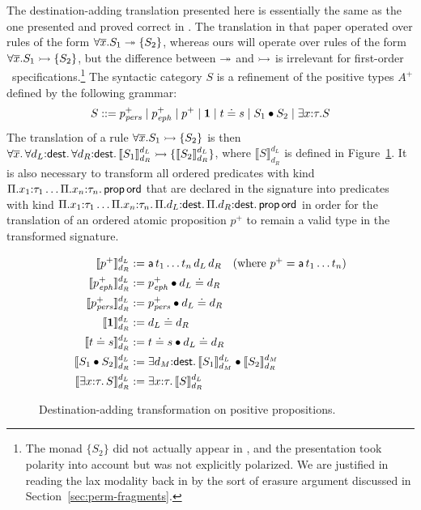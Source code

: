 The destination-adding translation presented here is essentially the
same as the one presented and proved correct in
\cite{simmons11logical}. The translation in that paper operated over
rules of the form $\forall \overline{x}. S_1 \twoheadrightarrow \{ S_2 \}$,
whereas ours will operate over rules of the form $\forall
\overline{x}. S_1 \rightarrowtail \{ S_2 \}$, but the difference between
$\twoheadrightarrow$ and $\rightarrowtail$ is irrelevant for first-order
\sls~specifications.\footnote{The monad $\{ S_2 \}$ did not actually
  appear in \cite{simmons11logical}, and the presentation took
  polarity into account but was not explicitly polarized. We are
  justified in reading the lax modality back in by the sort of erasure
  argument discussed in Section~\ref{sec:perm-fragments}.} The syntactic
category $S$ is a refinement of the positive types $A^+$ defined by
the following grammar:
\[
S ::= p^+_{\it pers} \mid p^+_{\it eph} \mid p^+ \mid \mathbf{1}
\mid t \doteq s \mid S_1 \mathbin{\bullet} S_2 \mid \exists x{:}\tau. S
\]
The translation of a rule $\forall \overline{x}. S_1 \rightarrowtail \{ S_2 \}$
is then $\forall \overline{x}.\, \forall d_L{:}{\sf dest}.\, \forall
d_R{:}{\sf dest}.\, \llbracket S_1 \rrbracket^{d_L}_{d_R} \rightarrowtail \{
\llbracket S_2 \rrbracket^{d_L}_{d_R} \}$, where $\llbracket S
\rrbracket^{d_L}_{d_R}$ is defined in Figure~\ref{fig:destadd-pos}. It
is also necessary to transform all ordered predicates with kind
$\Pi. x_1{:}\tau_1\ldots \Pi.x_n{:}\tau_n.\,{\sf prop\,ord}$ that are
declared in the signature into predicates with kind
$\Pi. x_1{:}\tau_1\ldots \Pi.x_n{:}\tau_n.\, \Pi.d_L{:}{\sf dest}.\,
\Pi.d_R{:}{\sf dest}.\, {\sf prop\,ord}$ in order for the translation
of an ordered atomic proposition $p^+$ to remain a valid type in
the transformed signature.

\begin{figure}
\begin{align*}
\llbracket p^+ \rrbracket^{d_L}_{d_R} & := 
 {\sf a}\,t_1\ldots t_n\,d_L\,d_R ~~~ \mbox{(where $p^+ = {\sf a}\,t_1\ldots t_n$)}
\\
\llbracket p^+_{\it eph} \rrbracket^{d_L}_{d_R} & := p^+_{\it eph} \mathbin{\bullet} d_L \doteq d_R
\\
\llbracket p^+_{\it pers} \rrbracket^{d_L}_{d_R} & := p^+_{\it pers} \mathbin{\bullet} d_L \doteq d_R
\\
\llbracket \mathbf{1} \rrbracket^{d_L}_{d_R} & := d_L \doteq d_R
\\
\llbracket t \doteq s \rrbracket^{d_L}_{d_R} & := t \doteq s \mathbin{\bullet} d_L \doteq d_R
\\
\llbracket S_1 \mathbin{\bullet} S_2 \rrbracket^{d_L}_{d_R} & := 
 \exists d_M{:}{\sf dest}.\, 
   \llbracket S_1 \rrbracket^{d_L}_{d_M}
   \mathbin{\bullet}
   \llbracket S_2 \rrbracket^{d_M}_{d_R}
\\
\llbracket \exists x{:}\tau.\,S \rrbracket^{d_L}_{d_R} & := 
 \exists x{:}\tau.\, \llbracket S \rrbracket^{d_L}_{d_R}
\end{align*}
\caption{Destination-adding transformation on positive propositions.}
\label{fig:destadd-pos}
\end{figure}


